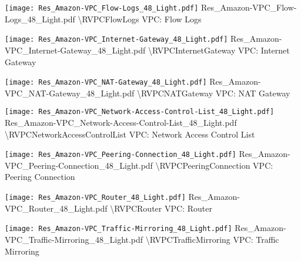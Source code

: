  {\texttt{[image: Res\_Amazon-VPC\_Flow-Logs\_48\_Light.pdf]}} {Res\_Amazon-VPC\_Flow-Logs\_48\_Light.pdf} {{\textbackslash}RVPCFlowLogs} {VPC: Flow Logs}

 {\texttt{[image: Res\_Amazon-VPC\_Internet-Gateway\_48\_Light.pdf]}} {Res\_Amazon-VPC\_Internet-Gateway\_48\_Light.pdf} {{\textbackslash}RVPCInternetGateway} {VPC: Internet Gateway}

 {\texttt{[image: Res\_Amazon-VPC\_NAT-Gateway\_48\_Light.pdf]}} {Res\_Amazon-VPC\_NAT-Gateway\_48\_Light.pdf} {{\textbackslash}RVPCNATGateway} {VPC: NAT Gateway}

 {\texttt{[image: Res\_Amazon-VPC\_Network-Access-Control-List\_48\_Light.pdf]}} {Res\_Amazon-VPC\_Network-Access-Control-List\_48\_Light.pdf} {{\textbackslash}RVPCNetworkAccessControlList} {VPC: Network Access Control List}

 {\texttt{[image: Res\_Amazon-VPC\_Peering-Connection\_48\_Light.pdf]}} {Res\_Amazon-VPC\_Peering-Connection\_48\_Light.pdf} {{\textbackslash}RVPCPeeringConnection} {VPC: Peering Connection}

 {\texttt{[image: Res\_Amazon-VPC\_Router\_48\_Light.pdf]}} {Res\_Amazon-VPC\_Router\_48\_Light.pdf} {{\textbackslash}RVPCRouter} {VPC: Router}

 {\texttt{[image: Res\_Amazon-VPC\_Traffic-Mirroring\_48\_Light.pdf]}} {Res\_Amazon-VPC\_Traffic-Mirroring\_48\_Light.pdf} {{\textbackslash}RVPCTrafficMirroring} {VPC: Traffic Mirroring}

